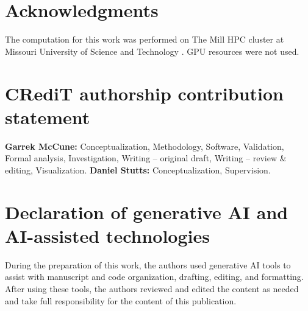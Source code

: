 \documentclass[11pt]{article}
\begin{document}
\section*{Acknowledgments}
The computation for this work was performed on The Mill HPC cluster at
Missouri University of Science and Technology \cite{mill2024}. GPU resources
were not used.

\section*{CRediT authorship contribution statement}
\textbf{Garrek McCune:} Conceptualization, Methodology, Software, Validation,
Formal analysis, Investigation, Writing -- original draft, Writing -- review \&
editing, Visualization. \textbf{Daniel Stutts:} Conceptualization,
Supervision.

\section*{Declaration of generative AI and AI-assisted technologies}
During the preparation of this work, the authors used generative AI tools to
assist with manuscript and code organization, drafting, editing, and
formatting. After using these tools, the authors reviewed and edited the
content as needed and take full responsibility for the content of this
publication.
\normalsize
\end{document}
